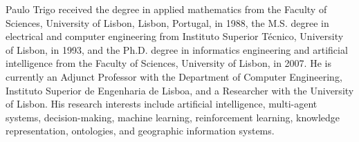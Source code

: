 \documentclass{ieeeaccess}
\begin{document}
\begin{IEEEbiographynophoto}{Paulo Trigo}
received the degree in applied mathematics from the Faculty of Sciences,
University of Lisbon, Lisbon, Portugal, in 1988, the M.S. degree in electrical
and computer engineering from Instituto Superior T\'ecnico, University of
Lisbon, in 1993, and the Ph.D. degree in informatics engineering and artificial
intelligence from the Faculty of Sciences, University of Lisbon, in 2007. He is
currently an Adjunct Professor with the Department of Computer Engineering,
Instituto Superior de Engenharia de Lisboa, and a Researcher with the
University of Lisbon. His research interests include artificial intelligence,
multi-agent systems, decision-making, machine learning, reinforcement learning,
knowledge representation, ontologies, and geographic information systems.
\end{IEEEbiographynophoto}

\EOD
\end{document}
